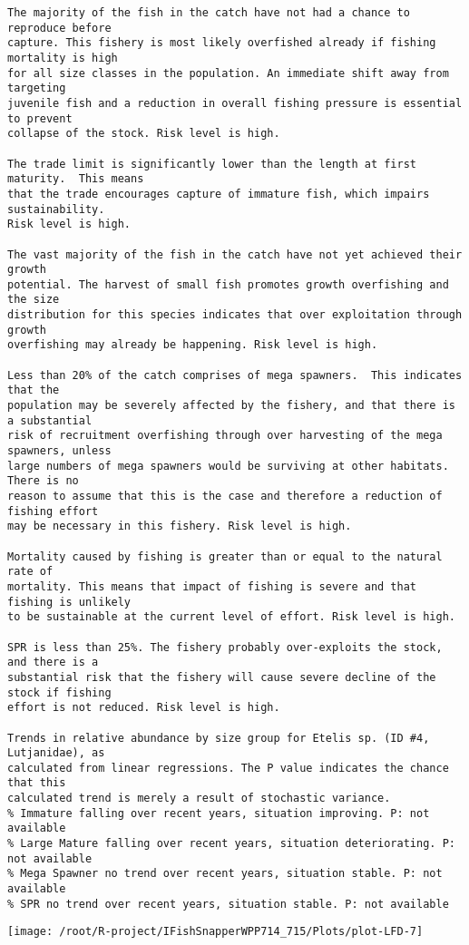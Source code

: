 \documentclass{report}\usepackage[]{graphicx}\usepackage[]{color}
\makeatletter
\def\maxwidth{ %
  \ifdim\Gin@nat@width>\linewidth
    \linewidth
  \else
    \Gin@nat@width
  \fi
}
\newenvironment{kframe}{%
 \def\at@end@of@kframe{}%
 \ifinner\ifhmode%
  \def\at@end@of@kframe{\end{minipage}}%
  \begin{minipage}{\columnwidth}%
 \fi\fi%
 \def\FrameCommand##1{\hskip\@totalleftmargin \hskip-\fboxsep
 \colorbox{shadecolor}{##1}\hskip-\fboxsep
     \hskip-\linewidth \hskip-\@totalleftmargin \hskip\columnwidth}%
 \MakeFramed {\advance\hsize-\width
   \@totalleftmargin\z@ \linewidth\hsize
   \@setminipage}}%
 {\par\unskip\endMakeFramed%
 \at@end@of@kframe}
\newenvironment{knitrout}{}{} %
\makeatother
\begin{document}
\begin{knitrout}
\begin{kframe}
\begin{verbatim}
The majority of the fish in the catch have not had a chance to reproduce before
capture. This fishery is most likely overfished already if fishing mortality is high
for all size classes in the population. An immediate shift away from targeting
juvenile fish and a reduction in overall fishing pressure is essential to prevent
collapse of the stock. Risk level is high.

The trade limit is significantly lower than the length at first maturity.  This means
that the trade encourages capture of immature fish, which impairs sustainability.
Risk level is high.

The vast majority of the fish in the catch have not yet achieved their growth
potential. The harvest of small fish promotes growth overfishing and the size
distribution for this species indicates that over exploitation through growth
overfishing may already be happening. Risk level is high.

Less than 20% of the catch comprises of mega spawners.  This indicates that the
population may be severely affected by the fishery, and that there is a substantial
risk of recruitment overfishing through over harvesting of the mega spawners, unless
large numbers of mega spawners would be surviving at other habitats. There is no
reason to assume that this is the case and therefore a reduction of fishing effort
may be necessary in this fishery. Risk level is high.
 
Mortality caused by fishing is greater than or equal to the natural rate of
mortality. This means that impact of fishing is severe and that fishing is unlikely
to be sustainable at the current level of effort. Risk level is high.
 
SPR is less than 25%. The fishery probably over-exploits the stock, and there is a
substantial risk that the fishery will cause severe decline of the stock if fishing
effort is not reduced. Risk level is high.
 
Trends in relative abundance by size group for Etelis sp. (ID #4, Lutjanidae), as
calculated from linear regressions. The P value indicates the chance that this
calculated trend is merely a result of stochastic variance.
% Immature falling over recent years, situation improving. P: not available
% Large Mature falling over recent years, situation deteriorating. P: not available
% Mega Spawner no trend over recent years, situation stable. P: not available
% SPR no trend over recent years, situation stable. P: not available
\end{verbatim}
\end{kframe}
\texttt{[image: /root/R-project/IFishSnapperWPP714\_715/Plots/plot-LFD-7]} 


\end{knitrout}
\end{document}

